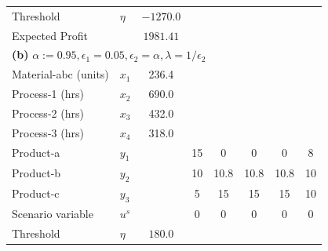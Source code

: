 \documentclass[7pt]{article}
\begin{document}
\begin{table}[h!]
\begin{tabular}{ll|c|ccccc}
        Threshold             & $\eta$                                     & $-1270.0$       &                                                                                     \\
        Expected Profit       &                                            & $1981.41$       &                                                                                     \\
        \midrule
        \multicolumn{8}{l}{\textbf{(b)} $\alpha := 0.95, \epsilon_1 = 0.05, \epsilon_2 = \alpha, \lambda = 1/\epsilon_2 $}                                                         \\
        \midrule
        Material-abc (units)  & $x_1$                                      & 236.4           &              &                   &               &                  &               \\
        Process-1 (hrs)       & $x_2$                                      & 690.0           &              &                   &               &                  &               \\
        Process-2 (hrs)       & $x_3$                                      & 432.0           &              &                   &               &                  &               \\
        Process-3 (hrs)       & $x_4$                                      & 318.0           &              &                   &               &                  &               \\
        Product-a             & $y_1$                                      &                 & 15           & 0                 & 0             & 0                & 8             \\
        Product-b             & $y_2$                                      &                 & 10           & 10.8              & 10.8          & 10.8             & 10            \\
        Product-c             & $y_3$                                      &                 & 5            & 15                & 15            & 15               & 10            \\
        Scenario variable     & $u^s$                                      &                 & 0            & 0                 & 0             & 0                & 0             \\
        Threshold             & $\eta$                                     & $180.0$         &                                                                                     \\

\end{tabular}
\end{table}
\end{document}

